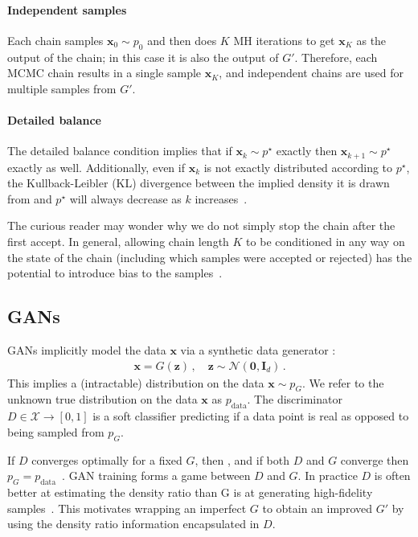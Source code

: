 \documentclass{article}
\renewcommand{\vec}[1]{{\boldsymbol{\mathbf{#1}}}} %
\newcommand{\R}{\mathbb{R}}
\newcommand{\set}[1]{\mathcal{#1}}
\newcommand{\sample}{\sim}
\newcommand{\norm}{\mathcal{N}}
\newcommand{\target}{{p^\star}}
\newcommand{\pinit}{{p_0}}
\newcommand{\PG}{{p_G}}
\newcommand{\PR}{{p_{\textrm{data}}}}
\newcommand{\setx}{\set{X}}
\begin{document}
\paragraph{Independent samples}
Each chain samples $\vec x_0 \sample \pinit$ and then does $K$ MH iterations to get $\vec x_K$ as the output of the chain; in this case it is also the output of $G'$.
Therefore, each MCMC chain results in a single sample $\vec x_K$, and independent chains are used for multiple samples from $G'$.

\paragraph{Detailed balance}
The detailed balance condition implies that if $\vec x_k \sample \target$ exactly then $\vec x_{k+1} \sample \target$ exactly as well.
Additionally, even if $\vec x_k$ is not exactly distributed according to $\target$, the Kullback-Leibler (KL) divergence between the implied density it is drawn from and $\target$ will always decrease as $k$ increases~\citep{Murray2008,Cover2012}.

The curious reader may wonder why we do not simply stop the chain after the first accept.
In general, allowing chain length $K$ to be conditioned in any way on the state of the chain (including which samples were accepted or rejected) has the potential to introduce bias to the samples~\citep{Cowles1999}.

\subsection{GANs}
\label{sec:GANs}

GANs implicitly model the data $\vec x$ via a synthetic data generator \smash{$G \in \R^{d} \rightarrow \setx$}:
\begin{align}
  \vec x = G(\vec z)\,, \quad \vec z \sample \norm(\vec 0, \vec I_{d})\,.
\end{align}
This implies a (intractable) distribution on the data $\vec x \sample \PG$.
We refer to the unknown true distribution on the data $\vec x$ as $\PR$.
The discriminator $D \in \setx \rightarrow [0,1]$ is a soft classifier predicting if a data point is real as opposed to being sampled from $\PG$\@.

If $D$ converges optimally for a fixed $G$, then \smash{$D = \PR/(\PR + \PG)$}, and if both $D$ and $G$ converge then $\PG = \PR$~\citep{Goodfellow2014}.
GAN training forms a game between $D$ and $G$.
In practice $D$ is often better at estimating the density ratio than G is at generating high-fidelity samples~\citep{Shibuya2017}.
This motivates wrapping an imperfect $G$ to obtain an improved $G'$ by using the density ratio information encapsulated in $D$.
\end{document}

